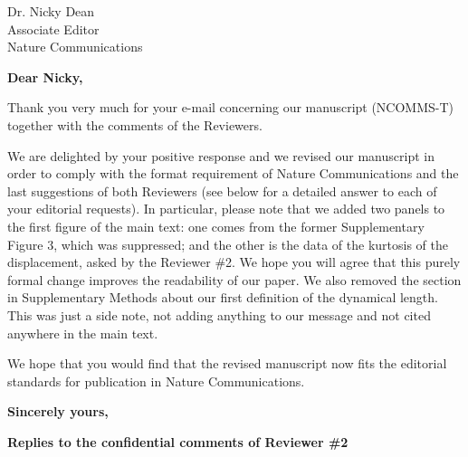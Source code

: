 \documentclass[a4paper, rebuttal, parskip=true, firsthead=false, fromemail=true, foldmarks=false]{scrlttr2}
\begin{document}
 
\begin{letter}{Dr. Nicky Dean\\
Associate Editor\\
Nature Communications}
\opening{\bf Dear Nicky,}

Thank you very much for your e-mail concerning our manuscript (NCOMMS\nobreakdash-T) together with the comments of the Reviewers. 

We are delighted by your positive response and we revised our manuscript in order to comply with the format requirement of Nature Communications and the last suggestions of both Reviewers (see below for a detailed answer to each of your editorial requests). In particular, please note that we added two panels to the first figure of the main text: one comes from the former Supplementary Figure 3, which was suppressed; and the other is the data of the kurtosis of the displacement, asked by the Reviewer \#2. We hope you will agree that this purely formal change improves the readability of our paper. We also removed the section in Supplementary Methods about our first definition of the dynamical length. This was just a side note, not adding anything to our message and not cited anywhere in the main text.

We hope that you would find that the revised manuscript now fits the editorial standards for publication in Nature Communications.

\closing{\bf Sincerely yours,} 
\clearpage

\textsf{\textbf{Replies to the confidential comments of Reviewer \#2}}


\end{letter}
\end{document}
